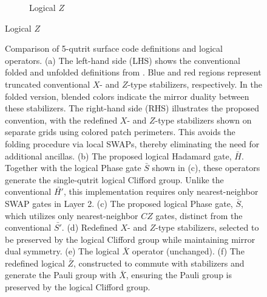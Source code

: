 \begin{figure}[H]
\begin{subfigure}[c]{0.6\textwidth}
\caption{Logical $Z$}
\end{subfigure}
\end{figure}

\begin{figure}[H]\ContinuedFloat
\centering
\caption{Comparison of 5-qutrit surface code definitions and logical operators. 
(a) The left-hand side (LHS) shows the conventional folded and unfolded definitions from \cite{Moussa2016}. Blue and red regions represent truncated conventional $X$- and $Z$-type stabilizers, respectively. In the folded version, blended colors indicate the mirror duality between these stabilizers. The right-hand side (RHS) illustrates the proposed convention, with the redefined $X$- and $Z$-type stabilizers shown on separate grids using colored patch perimeters. This avoids the folding procedure via local SWAPs, thereby eliminating the need for additional ancillas. 
(b) The proposed logical Hadamard gate, $\bar{H}$. Together with the logical Phase gate $\bar{S}$ shown in (c), these operators generate the single-qutrit logical Clifford group. Unlike the conventional $\bar{H'}$, this implementation requires only nearest-neighbor SWAP gates in Layer 2. 
(c) The proposed logical Phase gate, $\bar{S}$, which utilizes only nearest-neighbor $CZ$ gates, distinct from the conventional $\bar{S'}$. 
(d) Redefined $X$- and $Z$-type stabilizers, selected to be preserved by the logical Clifford group while maintaining mirror dual symmetry. 
(e) The logical $\bar{X}$ operator (unchanged). 
(f) The redefined logical $\bar{Z}$, constructed to commute with stabilizers and generate the Pauli group with $\bar{X}$, ensuring the Pauli group is preserved by the logical Clifford group.}
\label{fig: 5-qutrit-code}

\end{figure}
